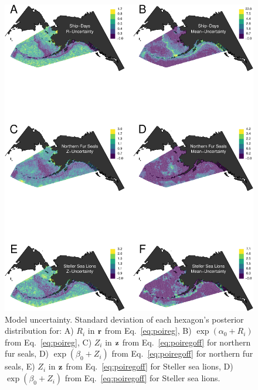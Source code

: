 \documentclass[11pt, titlepage]{article}
\begin{document}
\begin{spacing}{1.9}
\begin{flushleft}
\begin{figure}[H]
  \begin{center}
  \includegraphics[width=.8\linewidth]{Fig-Uncertainty}
  \end{center}
  \caption{Model uncertainty. Standard deviation of each hexagon's posterior distribution  for: A) $R_{i}$ in $\mathbf{r}$ from Eq.~\eqref{eq:poireg}, B) $\exp(\alpha_{0} + R_{i})$ from Eq.~\eqref{eq:poireg}, C) $Z_{i}$ in $\mathbf{z}$ from Eq.~\eqref{eq:poiregoff} for northern fur seals, D) $\exp(\beta_{0} + Z_{i})$ from Eq.~\eqref{eq:poiregoff} for northern fur seals, E) $Z_{i}$ in $\mathbf{z}$ from Eq.~\eqref{eq:poiregoff} for Steller sea lions, D) $\exp(\beta_{0} + Z_{i})$ from Eq.~\eqref{eq:poiregoff} for Steller sea lions.
  \label{Fig-Uncertainty}}         
\end{figure} 


\end{flushleft}
\end{spacing}
\end{document}
